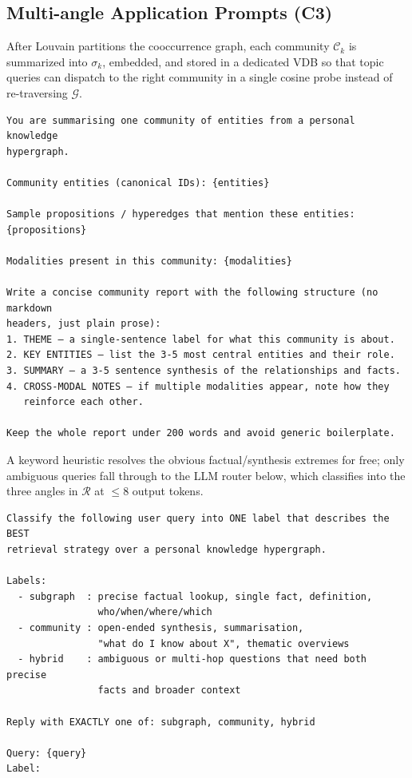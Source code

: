 \documentclass{article}
\begin{document}
\subsection{Multi-angle Application Prompts (C3)}

 After Louvain partitions the cooccurrence graph, each community $\mathcal{C}_k$ is summarized into $\sigma_k$, embedded, and stored in a dedicated VDB so that topic queries can dispatch to the right community in a single cosine probe instead of re-traversing $\mathcal{G}$.
\begin{shaded}
\footnotesize
\begin{verbatim}
You are summarising one community of entities from a personal knowledge
hypergraph.

Community entities (canonical IDs): {entities}

Sample propositions / hyperedges that mention these entities:
{propositions}

Modalities present in this community: {modalities}

Write a concise community report with the following structure (no markdown
headers, just plain prose):
1. THEME — a single-sentence label for what this community is about.
2. KEY ENTITIES — list the 3-5 most central entities and their role.
3. SUMMARY — a 3-5 sentence synthesis of the relationships and facts.
4. CROSS-MODAL NOTES — if multiple modalities appear, note how they
   reinforce each other.

Keep the whole report under 200 words and avoid generic boilerplate.
\end{verbatim}
\end{shaded}

 A keyword heuristic resolves the obvious factual/synthesis extremes for free; only ambiguous queries fall through to the LLM router below, which classifies into the three angles in $\mathcal{R}$ at $\leq\!8$ output tokens.
\begin{shaded}
\footnotesize
\begin{verbatim}
Classify the following user query into ONE label that describes the BEST
retrieval strategy over a personal knowledge hypergraph.

Labels:
  - subgraph  : precise factual lookup, single fact, definition,
                who/when/where/which
  - community : open-ended synthesis, summarisation,
                "what do I know about X", thematic overviews
  - hybrid    : ambiguous or multi-hop questions that need both precise
                facts and broader context

Reply with EXACTLY one of: subgraph, community, hybrid

Query: {query}
Label:
\end{verbatim}
\end{shaded}
\end{document}
